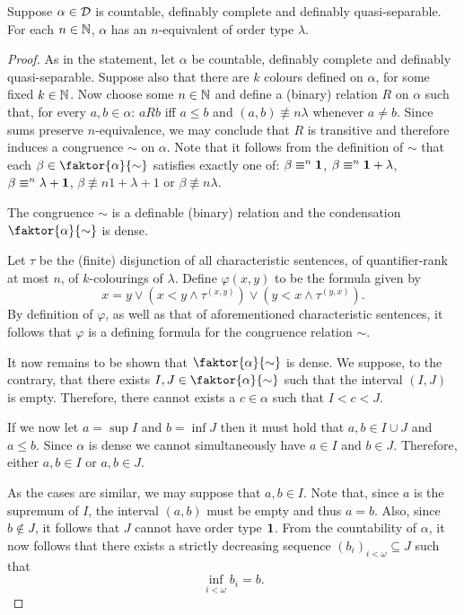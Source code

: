 \begin{thm}
	Suppose $\alpha\in\mathcal{D}$ is countable, definably complete and definably
	quasi-separable.  For each $n\in\mathbb{N}$, $\alpha$ has an $n$-equivalent of order
	type $\lambda$.
\end{thm}
\begin{proof}
	As in the statement, let $\alpha$ be countable, definably complete and
	definably quasi-separable.  Suppose also that there are $k$ colours defined on
	$\alpha$, for some fixed $k\in\mathbb{N}$.  Now choose some $n\in\mathbb{N}$ and define a
	(binary) relation $R$ on $\alpha$ such that, for every $a,b\in\alpha$:  $aRb$
	iff $a\leq b$ and $(a,b)\nequiv{n}\lambda$ whenever $a\neq b$.  Since sums
	preserve $n$-equivalence, we may conclude that $R$ is transitive and therefore
	induces a congruence $\sim$ on $\alpha$.  Note that it follows from the
	definition of $\sim$ that each $\beta\in\faktor{\alpha}{\sim}$ satisfies exactly
	one of: $\beta\equiv^{n}\mathbf{1}$, $\beta\equiv^{n}\mathbf{1}+\lambda$,
	$\beta\equiv^{n}\lambda+\mathbf{1}$, $\beta\nequiv{n}1+\lambda+1$ or
	$\beta\nequiv{n}\lambda$.

	\begin{claim}
		The congruence $\sim$ is a definable (binary) relation and the
		condensation $\faktor{\alpha}{\sim}$ is dense.
	\end{claim}
	Let $\tau$ be the (finite) disjunction of all characteristic sentences, of
	quantifier-rank at most $n$, of $k$-colourings of $\lambda$.  Define
	$\varphi(x,y)$ to be the formula given by
	\begin{equation}\label{eq:condef}
		x=y\vee(x<y\wedge\tau^{(x,y)})\vee(y<x\wedge\tau^{(y,x)}).
	\end{equation}
	By definition of $\varphi$, as well as that of aforementioned characteristic
	sentences, it follows that $\varphi$ is a defining formula for the
	congruence relation $\sim$.

	It now remains to be shown that $\faktor{\alpha}{\sim}$ is dense.  We
	suppose, to the contrary, that there exists $I,J\in\faktor{\alpha}{\sim}$ such
	that the interval $(I,J)$ is empty.  Therefore, there cannot exists a
	$c\in\alpha$ such that $I<c<J$.

	If we now let $a=\sup I$ and $b=\inf J$ then it must hold that
	$a,b\in I\cup J$ and $a\leq b$.  Since $\alpha$ is dense we cannot
	simultaneously have $a\in I$ and $b\in J$.  Therefore, either $a,b\in I$ or
	$a,b\in J$.

	As the cases are similar, we may suppose that $a,b\in I$.  Note that, since
	$a$ is the supremum of $I$, the interval $(a,b)$ must be empty and thus
	$a=b$.  Also, since $b\notin J$, it follows that $J$ cannot have order type
	$\mathbf{1}$.  From the countability of $\alpha$, it now follows that there exists
	a strictly decreasing sequence $(b_{i})_{i<\omega}\subseteq J$ such that
	\begin{equation}
		\inf_{i<\omega}b_{i}=b.
	\end{equation}


\end{proof}
